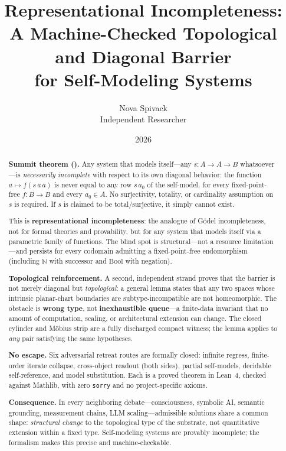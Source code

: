 \documentclass[11pt]{article}
\title{Representational Incompleteness:\\
  A Machine-Checked Topological and Diagonal Barrier\\
  for Self-Modeling Systems}
\author{Nova Spivack\\
Independent Researcher}
\date{2026}
\begin{document}
\maketitle

\begin{abstract}
\noindent\textbf{Summit theorem ().}
Any system that models itself---any $s : A \to A \to B$ whatsoever---is
\emph{necessarily incomplete} with respect to its own diagonal behavior:
the function $a \mapsto f(s\,a\,a)$ is never equal to any row $s\,a_0$
of the self-model, for every fixed-point-free $f : B \to B$ and every
$a_0 \in A$.  No surjectivity, totality, or cardinality assumption on
$s$ is required.  If $s$ is claimed to be total/surjective, it simply
cannot exist.

This is \textbf{representational incompleteness}: the analogue of
G\"odel incompleteness, not for formal theories and provability, but
for any system that models itself via a parametric family of functions.
The blind spot is structural---not a resource limitation---and
persists for every codomain admitting a fixed-point-free endomorphism
(including $\mathbb{N}$ with successor and $\mathrm{Bool}$ with
negation).

\medskip
\noindent\textbf{Topological reinforcement.}
A second, independent strand proves that the barrier is not merely
diagonal but \emph{topological}: a general lemma states that any two
spaces whose intrinsic planar-chart boundaries are subtype-incompatible
are not homeomorphic.  The obstacle is \textbf{wrong type}, not
\textbf{inexhaustible queue}---a finite-data invariant that no amount
of computation, scaling, or architectural extension can change.  The
closed cylinder and M\"obius strip are a fully discharged compact
witness; the lemma applies to \emph{any} pair satisfying the same
hypotheses.

\medskip
\noindent\textbf{No escape.}
Six adversarial retreat routes are formally closed: infinite regress,
finite-order iterate collapse, cross-object readout (both sides),
partial self-models, decidable self-reference, and model substitution.
Each is a proved theorem in Lean~4, checked against Mathlib, with zero
\texttt{sorry} and no project-specific axioms.

\medskip
\noindent\textbf{Consequence.}
In every neighboring debate---consciousness, symbolic AI, semantic
grounding, measurement chains, LLM scaling---admissible solutions share a
common shape: \emph{structural change} to the topological type of the
substrate, not quantitative extension within a fixed type.  Self-modeling
systems are provably incomplete; the formalism makes this precise and
machine-checkable.
\end{abstract}
\end{document}
